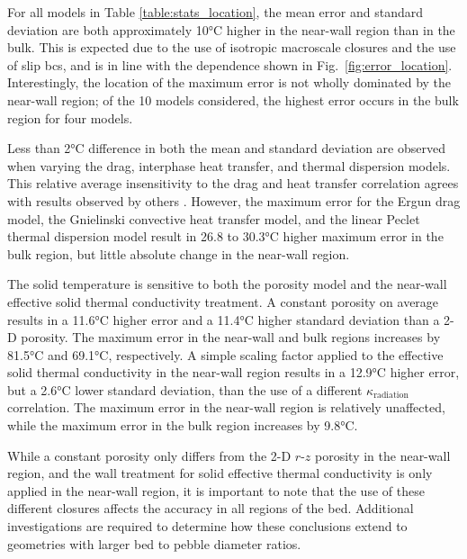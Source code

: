 For all models in Table \ref{table:stats_location}, the mean error and standard deviation are both approximately 10\si{\celsius} higher in the near-wall region than in the bulk. This is expected due to the use of isotropic macroscale closures and the use of slip \glspl{bc}, and is in line with the dependence shown in Fig.\ \ref{fig:error_location}. Interestingly, the location of the maximum error is not wholly dominated by the near-wall region; of the 10 models considered, the highest error occurs in the bulk region for four models.

Less than 2\si{\celsius} difference in both the mean and standard deviation are observed when varying the drag, interphase heat transfer, and thermal dispersion models. This relative average insensitivity to the drag and heat transfer correlation agrees with results observed by others \cite{becker}. However, the maximum error for the Ergun drag model, the Gnielinski convective heat transfer model, and the linear Peclet thermal dispersion model result in 26.8 to 30.3\si{\celsius} higher maximum error in the bulk region, but little absolute change in the near-wall region. 

The solid temperature is sensitive to both the porosity model and the near-wall effective solid thermal conductivity treatment. A constant porosity on average results in a 11.6\si{\celsius} higher error and a 11.4\si{\celsius} higher standard deviation than a 2-D porosity. The maximum error in the near-wall and bulk regions increases by 81.5\si{\celsius} and 69.1\si{\celsius}, respectively. A simple scaling factor applied to the effective solid thermal conductivity in the near-wall region results in a 12.9\si{\celsius} higher error, but a 2.6\si{\celsius} lower standard deviation, than the use of a different \(\kappa_\text{radiation}\) correlation. The maximum error in the near-wall region is relatively unaffected, while the maximum error in the bulk region increases by 9.8\si{\celsius}.

While a constant porosity only differs from the 2-D \(r\)-\(z\) porosity in the near-wall region, and the wall treatment for solid effective thermal conductivity is only applied in the near-wall region, it is important to note that the use of these different closures affects the accuracy in all regions of the bed. Additional investigations are required to determine how these conclusions extend to geometries with larger bed to pebble diameter ratios. 

